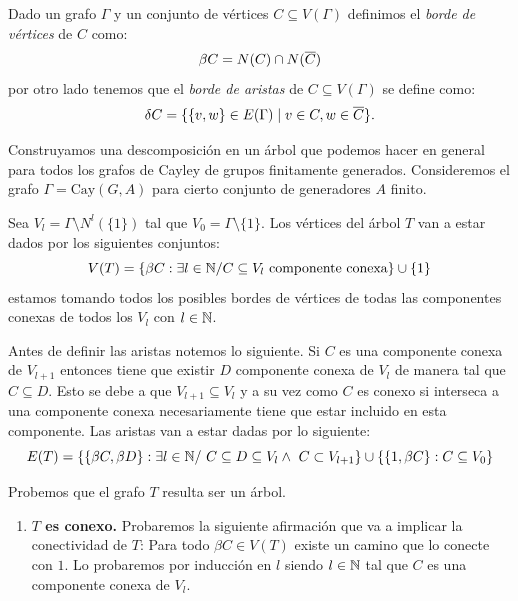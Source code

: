 \documentclass[tesis.tex]{subfiles}
\begin{document}
\begin{deff}
	Dado un grafo $\Gamma$ y un conjunto de vértices $C \subseteq V(\Gamma)$ definimos el \emph{borde de vértices} de $C$ como:
	\[
	\beta C =  N(C) \cap N(\overline{ C})
	\] 
	por otro lado tenemos que el \emph{borde de aristas} de $C \subseteq V(\Gamma)$ se define como:	
	\[
	\delta C = \{  \{v,w \} \in E(\Gamma) \mid v \in C, w \in \overline C    \}.
	\]
\end{deff}


\begin{center}
\end{center}

\begin{ej}\label{desc-grafo-cayley}%
	
	Construyamos una descomposición en un árbol que podemos hacer en general para todos los grafos de Cayley de grupos finitamente generados. 
	Consideremos el grafo $\Gamma = \text{Cay}(G,A)$ para cierto conjunto de generadores $A$ finito.
		
	
	Sea $V_l = \Gamma \setminus N^l(\{1\}) $ tal que $V_0 = \Gamma \setminus \{1\}$. 
	Los vértices del árbol $T$ van a estar dados por los siguientes conjuntos:
	\[
	V(T) = \{  \beta C : \exists l \in \mathbb{N} / C \subseteq V_l \ \text{componente conexa} \} \cup \{ 1 \}
	\]
	estamos tomando todos los posibles bordes de vértices 
	de todas las componentes conexas de todos los $V_l$ con $l \in \mathbb{N}$.
	 
	Antes de definir las aristas notemos lo siguiente.
	Si $C$ es una componente conexa de $V_{l+1}$ entonces tiene que existir $D$ componente conexa de $V_{l}$ de manera tal que $C \subseteq D$.
	Esto se debe a que $V_{l+1} \subseteq V_{l}$ y a su vez como $C$ es conexo si interseca a una componente conexa necesariamente tiene que estar incluido en esta componente.
	Las aristas van a estar dadas por lo siguiente:
	\[
	E(T) = \{ \{ \beta C, \beta D \} : \exists l \in \mathbb{N} / \ C \subseteq D \subseteq V_l \land \ C \subset V_{l+1}  \} \cup \{  \{1,\beta C\} : C \subseteq V_0  \}
	\]
	
	Probemos que el grafo $T$ resulta ser un árbol. 
	
	\begin{enumerate}[$\bullet$]
		\item \textbf{$T$ es conexo.}
		Probaremos la siguiente afirmación que va a implicar la conectividad de $T$:
		Para todo $\beta C \in V(T)$ existe un camino que lo conecte con $1$.
		Lo probaremos por inducción en $l$ siendo $l \in \mathbb{N}$ tal que $C$ es una componente conexa de $V_{l}$.
		

\end{enumerate}
\end{ej}
\end{document}
